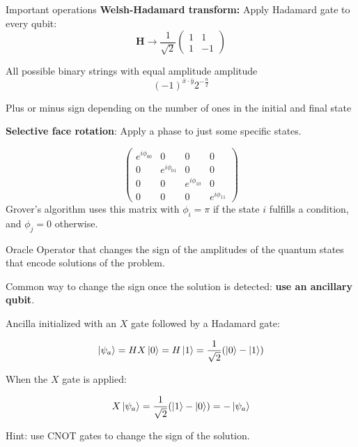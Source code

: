 \documentclass[11p,aspectratio=169]{beamer}
\begin{document}
\begin{frame}{Important operations}
    \textbf{Welsh-Hadamard transform:} Apply Hadamard gate to every qubit:
    \begin{equation*}
        \textbf{H} \rightarrow \frac{1}{\sqrt{2}}
    \begin{pmatrix}
       1 & 1 \\
       1 & -1  
    \end{pmatrix}
    \end{equation*}

    All possible binary strings with equal amplitude amplitude
    \begin{equation*}
        (- 1)^{\bar{x} \cdot \bar{y}} 2^{- \frac{n}{2}}
    \end{equation*}

    Plus or minus sign depending on the number of ones in the initial and final state
    
    \textbf{Selective face rotation}: Apply a phase to just some specific states.

    \begin{equation*}
        \begin{pmatrix}
            e^{ i \phi_{00}} & 0 & 0 & 0\\
            0 & e^{ i \phi_{01}} & 0 & 0\\
            0 & 0 & e^{ i \phi_{10}} & 0\\
            0 & 0 & 0 & e^{ i \phi_{11}} 
        \end{pmatrix}
    \end{equation*}
    Grover’s algorithm uses this matrix with $\phi_i = \pi$ if the state $i$
    fulfills a condition, and $\phi_j = 0$ otherwise.
\end{frame}

\begin{frame}{Oracle}
    Operator that changes the sign of the amplitudes of the quantum
    states that encode solutions of the problem.

    Common way to change the sign once the solution is detected: 
    \textbf{use an ancillary qubit}.

    Ancilla initialized with an $X$ gate followed by a Hadamard gate:

    \begin{equation*}
        \ket{\psi_a} = HX\ket{0} = H\ket{1} = \frac{1}{\sqrt{2}} (\ket{0} - \ket{1})
    \end{equation*}

    When the $X$ gate is applied:

    \begin{equation*}
        X \ket{\psi_a} = \frac{1}{\sqrt{2}} (\ket{1} - \ket{0}) = - \ket{\psi_a}
    \end{equation*}

    Hint: use CNOT gates to change the sign of the solution. 
\end{frame}
\end{document}
